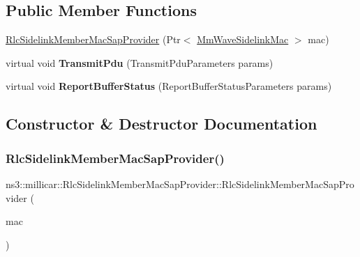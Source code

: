 \subsection*{Public Member Functions}
\begin{DoxyCompactItemize}
\item 
\hyperlink{classns3_1_1millicar_1_1RlcSidelinkMemberMacSapProvider_a178e79caf8df4d7bb738bb0dbef70530}{Rlc\+Sidelink\+Member\+Mac\+Sap\+Provider} (Ptr$<$ \hyperlink{classns3_1_1millicar_1_1MmWaveSidelinkMac}{Mm\+Wave\+Sidelink\+Mac} $>$ mac)
\item 
\mbox{\label{classns3_1_1millicar_1_1RlcSidelinkMemberMacSapProvider_ae05a79a4fc56b618d90130ec39c9009d}} 
virtual void {\bfseries Transmit\+Pdu} (Transmit\+Pdu\+Parameters params)
\item 
\mbox{\label{classns3_1_1millicar_1_1RlcSidelinkMemberMacSapProvider_ac15e814e840c8b50cbfa7c60eef287dd}} 
virtual void {\bfseries Report\+Buffer\+Status} (Report\+Buffer\+Status\+Parameters params)
\end{DoxyCompactItemize}


\subsection{Constructor \& Destructor Documentation}
\mbox{\label{classns3_1_1millicar_1_1RlcSidelinkMemberMacSapProvider_a178e79caf8df4d7bb738bb0dbef70530}} 
\subsubsection{\texorpdfstring{Rlc\+Sidelink\+Member\+Mac\+Sap\+Provider()}{RlcSidelinkMemberMacSapProvider()}}
{\footnotesize\ttfamily ns3\+::millicar\+::\+Rlc\+Sidelink\+Member\+Mac\+Sap\+Provider\+::\+Rlc\+Sidelink\+Member\+Mac\+Sap\+Provider (\begin{DoxyParamCaption}\item[{Ptr$<$ \hyperlink{classns3_1_1millicar_1_1MmWaveSidelinkMac}{Mm\+Wave\+Sidelink\+Mac} $>$}]{mac }\end{DoxyParamCaption})}

